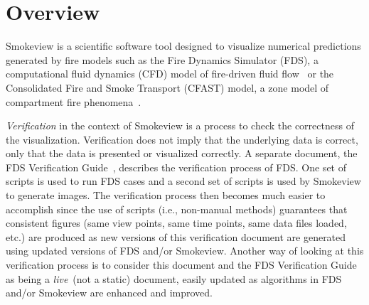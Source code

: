 \documentclass[11pt,twoside]{book}
\begin{document}
\cleardoublepage
\tableofcontents

\cleardoublepage
\listoffigures

\mainmatter


%
%
%

\chapter{Overview}
Smokeview is a scientific software tool designed to visualize numerical predictions
generated by fire models such as the Fire Dynamics Simulator (FDS), a computational
fluid dynamics (CFD) model of fire-driven fluid flow~\cite{FDS_Users_Guide,FDS_Math_Guide}
or the Consolidated Fire and Smoke Transport (CFAST) model, a zone model of compartment
fire phenomena~\cite{CFAST_Tech_Guide_7}.



{\em Verification} in the context of Smokeview is a process to check the correctness
of the visualization.  Verification does not imply that the underlying data is correct,
only that the data is presented or visualized correctly. A separate document, the
FDS Verification Guide~\cite{FDS_Verification_Guide}, describes the verification
process of FDS.  One set of scripts is used to run FDS cases and a second set of
scripts is used by Smokeview to generate images.  The verification process then
becomes much easier to accomplish since the use of scripts (i.e., non-manual methods)
guarantees that consistent figures (same view points, same time points, same data files
loaded, etc.) are produced as new versions of this verification document are
generated using updated versions of FDS and/or Smokeview.  Another way of looking
at this verification process is to consider this document and the FDS Verification
Guide~\cite{FDS_Verification_Guide} as being a {\em  live}\ (not a static) document,
easily updated as algorithms in FDS and/or Smokeview are enhanced and improved.
\end{document}
